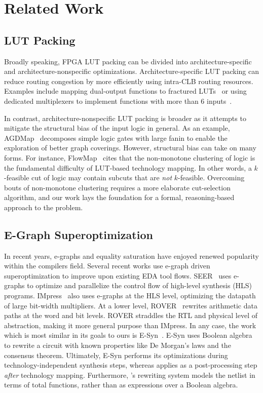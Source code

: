 \section{Related Work}\label{sec:relatedwork}
\subsection{LUT Packing}\label{sec:relatedwork:fpga}
Broadly speaking, FPGA LUT packing can be divided into architecture-specific
and architecture-nonspecific optimizations. Architecture-specific LUT packing
can reduce routing congestion by more efficiently using intra-CLB routing
resources. Examples include mapping dual-output functions to fractured
LUTs~\cite{fraclut} or using dedicated multiplexers to implement functions with
more than 6 inputs~\cite{ug574}. 

In contrast, architecture-nonspecific LUT packing is broader as it attempts to
mitigate the structural bias of the input logic in general. As an example,
AGDMap~\cite{adaptdecomp} decomposes simple logic gates with large fanin to
enable the exploration of better graph coverings. However, structural bias can
take on many forms. For instance, FlowMap~\cite{flowmap} cites that the
non-monotone clustering of logic is the fundamental difficulty of LUT-based
technology mapping. In other words, a $k$-feasible cut of logic may contain
subcuts that are \textit{not} $k$-feasible. Overcoming bouts of non-monotone
clustering requires a more elaborate cut-selection algorithm, and our work lays
the foundation for a formal, reasoning-based approach to the problem.

\subsection{E-Graph Superoptimization}\label{sec:relatedwork:egraph}
In recent years, e-graphs and equality saturation have enjoyed renewed
popularity within the compilers field. Several recent works use e-graph driven
superoptimization to improve upon existing EDA tool flows. SEER~\cite{seer}
uses e-graphs to optimize and parallelize the control flow of high-level
synthesis (HLS) programs. IMpress~\cite{impress} also uses e-graphs at the HLS
level, optimizing the datapath of large bit-width multipliers. At a lower
level, ROVER~\cite{rover,roverbl,egraphconstraints} rewrites arithmetic data
paths at the word and bit levels. ROVER straddles the RTL and physical level of
abstraction, making it more general purpose than IMpress. In any case, the work
which is most similar in its goals to ours is E-Syn~\cite{esynth}. E-Syn uses
Boolean algebra to rewrite a circuit with known properties like De Morgan's
laws and the consensus theorem. Ultimately, E-Syn performs its optimizations
during technology-independent synthesis steps, whereas \shortname{} applies as
a post-processing step \textit{after} technology mapping. Furthermore,
\shortname{}'s rewriting system models the netlist in terms of total functions,
rather than as expressions over a Boolean algebra.